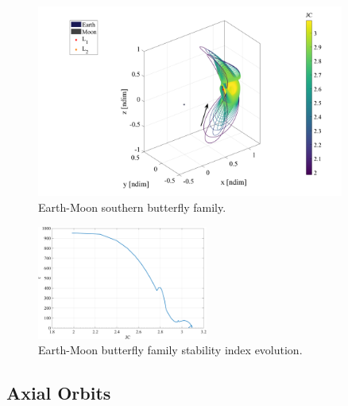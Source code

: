 \begin{figure}[ht]
    \centering
    \includegraphics[width=0.9\textwidth]{figures/L2ButterflyFamily.pdf}
    \caption{Earth-Moon southern butterfly family.}
    \label{fig:butterfly}
\end{figure}

\begin{figure}[ht]
    \centering
    \includegraphics[width=0.5\textwidth]{figures/L2ButterflyStability.pdf}
    \caption{Earth-Moon butterfly family stability index evolution.}
    \label{fig:butterflyStability}
\end{figure}

\subsection{Axial Orbits}
